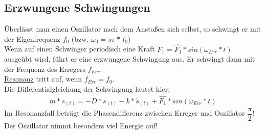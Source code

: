 	\subsection{Erzwungene Schwingungen}
	Überlässt man einen Oszillator nach dem Anstoßen sich selbst, so schwingt er mit der Eigenfrequenz $f_0$ (bzw. $\omega_0=s\pi*f_0$)\\
	Wenn auf einen Schwinger periodisch eine Kraft $F_1=\hat{F_1}*sin(\omega_{Err}*t)$ ausgeübt wird, führt er eine erzwungene Schwingung aus. Er schwingt dann mit der Frequenz des Erregers $f_{Err}$.\\
	\underline{Resonanz} tritt auf, wenn $f_{Err}=f_0$.\\
	Die Differentialgleichung der Schwingung lautet hier:\\
	\begin{align}
		m*\ddot{s}_{(t)}=-D*s_{(t)}-k*\dot{s}_{(t)}+\hat{F_1}*sin(\omega_{Err}*t)
	\end{align}
	Im Resonanzfall beträgt die Phasendifferenz zwischen Erreger und Oszillator $\dfrac{\pi}{2}$!\\
	Der Oszillator nimmt besonders viel Energie auf!